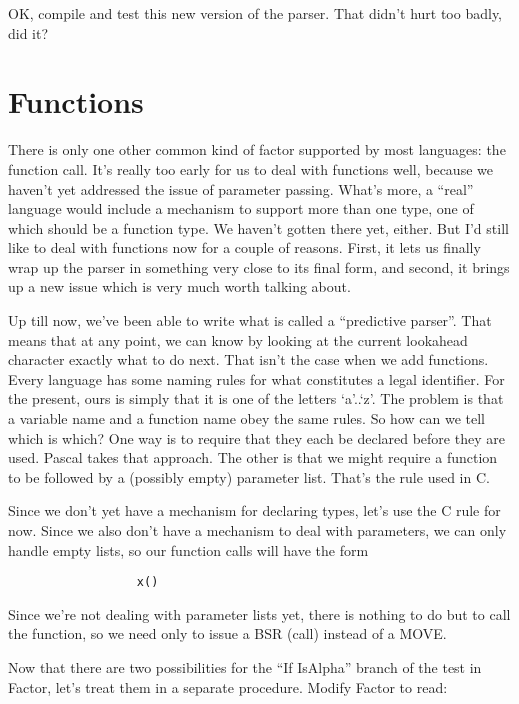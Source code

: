 OK, compile and test this new version of the parser. That didn't hurt too badly, did it?

\section{Functions}

There is only one  other  common kind of factor supported by most languages: the function call. It's really too early  for  us  to deal with functions well, because  we  haven't yet addressed the issue of parameter passing. What's more, a ``real'' language would
include a mechanism to  support  more than one type, one of which should be a function type. We haven't gotten there  yet, either. But I'd still like to deal with functions  now  for  a  couple of reasons. First, it  lets  us  finally  wrap  up the parser in something very close to its final form, and second, it  brings up a new issue which is very much worth talking about.

Up  till  now, we've  been  able  to  write  what  is  called  a ``predictive parser''.  That  means  that at any point, we can know by looking at the current  lookahead character exactly what to do next. That isn't the case when we add functions. Every language has some naming rules  for  what  constitutes a legal identifier. For the present, ours is simply that it  is  one  of  the letters `a'..`z'. The  problem  is  that  a variable name and a function name obey  the  same  rules. So how can we tell which is which?  One way is to require that they each be declared before  they are used. Pascal  takes that approach. The other is that we might require a function to be followed by a (possibly empty) parameter list. That's the rule used in C.

Since  we  don't  yet have a mechanism for declaring types, let's use the C  rule for now. Since we also don't have a mechanism to deal  with parameters, we can only handle  empty  lists, so  our function calls will have the form

\begin{verbatim}
                  x()
\end{verbatim}

Since  we're  not  dealing  with  parameter lists yet, there  is nothing  to do but to call the function, so we need only to issue a BSR (call) instead of a MOVE.

Now that there are two  possibilities for the ``If IsAlpha'' branch of the test in Factor, let's treat them in a  separate procedure. Modify Factor to read:

